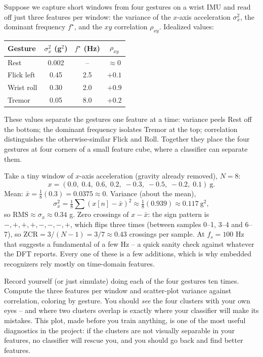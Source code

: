 Suppose we capture short windows from four gestures on a wrist IMU and read off just three features per window: the variance of the $x$-axis acceleration $\sigma_x^2$, the dominant frequency $f^\star$, and the $xy$ correlation $\rho_{xy}$. Idealized values:

\begin{center}
\begin{tabular}{lccc}
\toprule
Gesture & $\sigma_x^2$ (g$^2$) & $f^\star$ (Hz) & $\rho_{xy}$ \\
\midrule
Rest        & 0.002 & --   & $\approx 0$ \\
Flick left  & 0.45  & 2.5  & $+0.1$ \\
Wrist roll  & 0.30  & 2.0  & $+0.9$ \\
Tremor      & 0.05  & 8.0  & $+0.2$ \\
\bottomrule
\end{tabular}
\end{center}

These values separate the gestures one feature at a time: variance peels Rest off the bottom; the dominant frequency isolates Tremor at the top; correlation distinguishes the otherwise-similar Flick and Roll. Together they place the four gestures at four corners of a small feature cube, where a classifier can separate them.

\begin{example}
\label{ch38:ex-compute}
Take a tiny window of $x$-axis acceleration (gravity already removed), $N = 8$:
\[
  x = (0.0,\; 0.4,\; 0.6,\; 0.2,\; -0.3,\; -0.5,\; -0.2,\; 0.1)\ \text{g}.
\]
Mean: $\bar x = \tfrac{1}{8}(0.3) = 0.0375 \approx 0$. Variance (about the mean),
\[
  \sigma_x^2 = \tfrac18\sum (x[n]-\bar x)^2 \approx \tfrac18(0.939) \approx 0.117\ \text{g}^2,
\]
so $\mathrm{RMS} \approx \sigma_x \approx 0.34$ g. Zero crossings of $x-\bar x$:
the sign pattern is $-,+,+,+,-,-,-,+$, which flips three times (between samples
0--1, 3--4 and 6--7), so $\mathrm{ZCR} = 3/(N-1) = 3/7 \approx 0.43$ crossings per
sample. At $f_s = 100$ Hz that suggests a fundamental of a few Hz -- a quick
sanity check against whatever the DFT reports. Every one of these is a few
additions, which is why embedded recognizers rely mostly on time-domain
features.
\end{example}

\begin{labbox}
Record yourself (or just simulate) doing each of the four gestures ten times.
Compute the three features per window and scatter-plot variance against
correlation, coloring by gesture. You should \emph{see} the four clusters with
your own eyes -- and where two clusters overlap is exactly where your classifier
will make its mistakes. This plot, made before you train anything, is one of the
most useful diagnostics in the project: if the clusters are not visually
separable in your features, no classifier will rescue you, and you should go back
and find better features.
\end{labbox}


